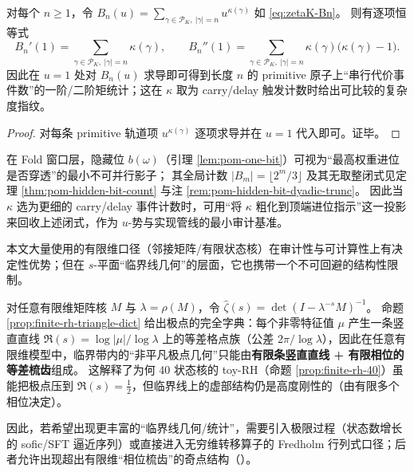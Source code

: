 \begin{corollary}\label{cor:zetaK-primitive-moments}
对每个 \(n\ge 1\)，令
\(
B_n(u)=\sum_{\gamma\in\mathcal{P}_K,\ |\gamma|=n} u^{\kappa(\gamma)}
\)
如 \eqref{eq:zetaK-Bn}。
则有逐项恒等式
\[
\boxed{\;
B_n'(1)=\sum_{\gamma\in\mathcal{P}_K,\ |\gamma|=n}\kappa(\gamma),\qquad
B_n''(1)=\sum_{\gamma\in\mathcal{P}_K,\ |\gamma|=n}\kappa(\gamma)\bigl(\kappa(\gamma)-1\bigr).\;}
\]
因此在 \(u=1\) 处对 \(B_n(u)\) 求导即可得到长度 \(n\) 的 primitive 原子上“串行代价事件数”的一阶/二阶矩统计；这在 \(\kappa\) 取为 carry/delay 触发计数时给出可比较的复杂度指纹。
\end{corollary}
\begin{proof}
对每条 primitive 轨道项 \(u^{\kappa(\gamma)}\) 逐项求导并在 \(u=1\) 代入即可。证毕。
\end{proof}

\begin{remark}[以顶端溢出比特为最小势的校准基准]\label{rem:zetaK-overflow-calibration}
在 Fold 窗口层，隐藏位 \(b(\omega)\)（引理 \ref{lem:pom-one-bit}）可视为“最高权重进位是否穿透”的最小不可并行影子；
其全局计数 \(|B_m|=\lfloor 2^m/3\rfloor\) 及其无取整闭式见定理 \ref{thm:pom-hidden-bit-count} 与注 \ref{rem:pom-hidden-bit-dyadic-trunc}。
因此当 \(\kappa\) 选为更细的 carry/delay 事件计数时，可用“将 \(\kappa\) 粗化到顶端进位指示”这一投影来回收上述闭式，作为 \(u\)-势与实现管线的最小审计基准。
\end{remark}

\begin{remark}\label{rem:finite-pole-lattice-barrier}
本文大量使用的有限维口径（邻接矩阵/有限状态核）在审计性与可计算性上有决定性优势；但在 \(s\)-平面“临界线几何”的层面，它也携带一个不可回避的结构性限制。

对任意有限维矩阵核 \(M\) 与 \(\lambda=\rho(M)\)，令
\(
\widehat{\zeta}(s)=\det(I-\lambda^{-s}M)^{-1}
\)。
命题 \ref{prop:finite-rh-triangle-dict} 给出极点的完全字典：每个非零特征值 \(\mu\) 产生一条竖直直线
\(
\Re(s)=\log|\mu|/\log\lambda
\)
上的等差格点族（公差 \(2\pi/\log\lambda\)），因此在任意有限维模型中，临界带内的“非平凡极点几何”只能由\textbf{有限条竖直直线 + 有限相位的等差梳齿}组成。
这解释了为何 40 状态核的 toy-RH（命题 \ref{prop:finite-rh-40}）虽能把极点压到 \(\Re(s)=\tfrac12\)，但临界线上的虚部结构仍是高度刚性的（由有限多个相位决定）。

因此，若希望出现更丰富的“临界线几何/统计”，需要引入极限过程（状态数增长的 sofic/SFT 逼近序列）或直接进入无穷维转移算子的 Fredholm 行列式口径；后者允许出现超出有限维“相位梳齿”的奇点结构（\cite{Ruelle1976ZetaExpanding,Ruelle1978Thermodynamic,ParryPollicott1990Zeta}）。
\end{remark}

